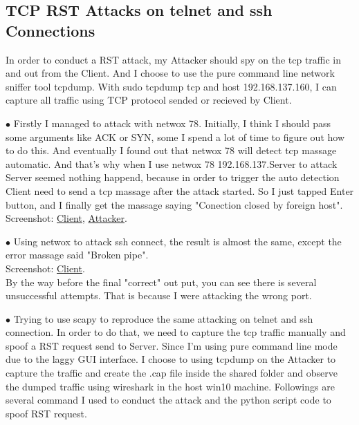 \documentclass{article}
\newcommand{\code}[1]{{\ttfamily #1}}
\begin{document}
\subsection{TCP RST Attacks on {\ttfamily telnet} and {\ttfamily ssh} Connections}
In order to conduct a RST attack, my Attacker should spy on the tcp traffic in and out from the Client. And I choose to use the pure command line network sniffer tool \code{tcpdump}.
With \code{sudo tcpdump tcp and host 192.168.137.160}, I can capture all traffic using TCP protocol sended or recieved by Client.
\begin{tlist}{3}
  \item[$\bullet$]
  Firstly I managed to attack with \code{netwox 78}. Initially, I think I should pass some arguments like \code{ACK} or \code{SYN}, some I spend a lot of time to figure out how to do this. And eventually I found out that \code{netwox 78} will detect tcp massage automatic. And that's why when I use \code{netwox 78 192.168.137.Server} to attack Server seemed nothing happend, because in order to trigger the auto detection Client need to send a tcp massage after the attack started. So I just tapped Enter button, and I finally get the massage saying \code{"Conection closed by foreign host"}.\\
  Screenshot:
  \href{https://i.loli.net/2018/09/11/5b9751105d0b4.png}{Client},
  \href{https://i.loli.net/2018/09/11/5b9751105e414.png}{Attacker}.
  \item[$\bullet$]
  Using \code{netwox} to attack ssh connect, the result is almost the same, except the error massage said \code{"Broken pipe"}.\\
  Screenshot:
  \href{https://i.loli.net/2018/09/11/5b97536e44d80.png}{Client}.\\
  By the way before the final "correct" out put, you can see there is several unsuccessful attempts. That is because I were attacking the wrong port.
  \item[$\bullet$]
  Trying to use scapy to reproduce the same attacking on telnet and ssh connection. In order to do that, we need to capture the tcp traffic manually and spoof a RST request send to Server. Since I'm using pure command line mode due to the laggy GUI interface. I choose to using \code{tcpdump} on the Attacker to capture the traffic and create the \code{.cap} file inside the shared folder and observe the dumped traffic using wireshark in the host win10 machine. Followings are several command I used to conduct the attack and the python script code to spoof RST request.\\

\end{tlist}
\end{document}
